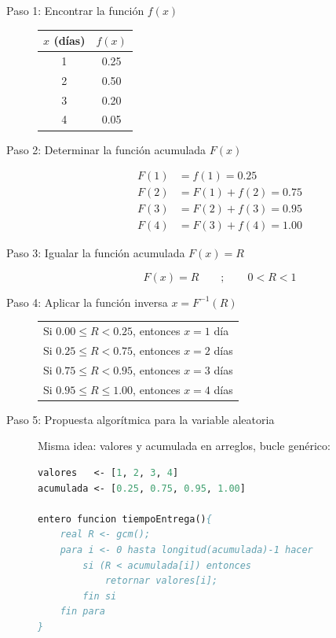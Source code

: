 \begin{description}
    \item[Paso 1: Encontrar la función $f(x)$]

    \begin{center}
    \begin{tabular}{cc}
    \toprule
    $x$ (días) & $f(x)$ \\
    \midrule
    1 & 0.25 \\
    2 & 0.50 \\
    3 & 0.20 \\
    4 & 0.05 \\
    \bottomrule
    \end{tabular}
    \end{center}

    \item[Paso 2: Determinar la función acumulada $F(x)$]

    \begin{align*}
    F(1) &= f(1) = 0.25 \\
    F(2) &= F(1)+f(2) = 0.75 \\
    F(3) &= F(2)+f(3) = 0.95 \\
    F(4) &= F(3)+f(4) = 1.00
    \end{align*}

    \item[Paso 3: Igualar la función acumulada $F(x) = R$]

    $$ F(x)=R \qquad ; \qquad 0 < R < 1 $$

    \item[Paso 4: Aplicar la función inversa $x=F^{-1}(R)$]

    \begin{center}
    \begin{tabular}{l}
    Si $0.00 \leq R < 0.25$, entonces $x=1$ día \\
    Si $0.25 \leq R < 0.75$, entonces $x=2$ días \\
    Si $0.75 \leq R < 0.95$, entonces $x=3$ días \\
    Si $0.95 \leq R \leq 1.00$, entonces $x=4$ días \\
    \end{tabular}
    \end{center}

    \item[Paso 5: Propuesta algorítmica para la variable aleatoria]

    Misma idea: valores y acumulada en arreglos, bucle genérico:

    \begin{lstlisting}[caption={tiempoEntrega()}, language=Pascal]
valores   <- [1, 2, 3, 4]
acumulada <- [0.25, 0.75, 0.95, 1.00]

entero funcion tiempoEntrega(){
    real R <- gcm();
    para i <- 0 hasta longitud(acumulada)-1 hacer
        si (R < acumulada[i]) entonces
            retornar valores[i];
        fin si
    fin para
}
    \end{lstlisting}
\end{description}

